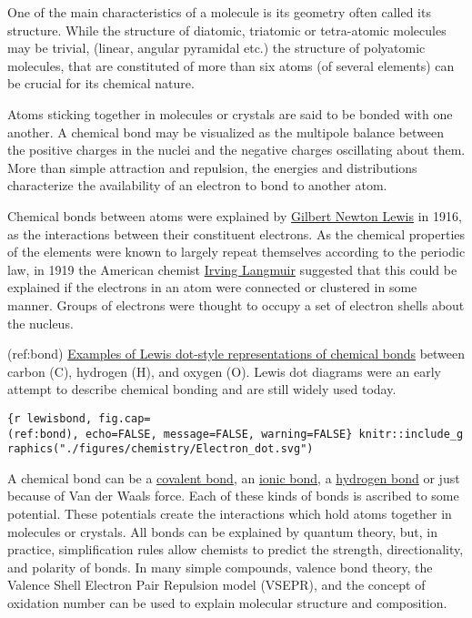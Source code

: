 \documentclass[
]{article}
\begin{document}
One of the main characteristics of a molecule is its geometry often
called its structure. While the structure of diatomic, triatomic or
tetra-atomic molecules may be trivial, (linear, angular pyramidal etc.)
the structure of polyatomic molecules, that are constituted of more than
six atoms (of several elements) can be crucial for its chemical nature.

Atoms sticking together in molecules or crystals are said to be bonded
with one another. A chemical bond may be visualized as the multipole
balance between the positive charges in the nuclei and the negative
charges oscillating about them. More than simple attraction and
repulsion, the energies and distributions characterize the availability
of an electron to bond to another atom.

Chemical bonds between atoms were explained by
\href{https://en.wikipedia.org/wiki/Gilbert_N._Lewis}{Gilbert Newton
Lewis} in 1916, as the interactions between their constituent electrons.
As the chemical properties of the elements were known to largely repeat
themselves according to the periodic law, in 1919 the American chemist
\href{https://en.wikipedia.org/wiki/Irving_Langmuir}{Irving Langmuir}
suggested that this could be explained if the electrons in an atom were
connected or clustered in some manner. Groups of electrons were thought
to occupy a set of electron shells about the nucleus.

(ref:bond)
\href{https://en.wikipedia.org/wiki/Chemical_bond\#/media/File:Electron_dot.svg}{Examples
of Lewis dot-style representations of chemical bonds} between carbon
(C), hydrogen (H), and oxygen (O). Lewis dot diagrams were an early
attempt to describe chemical bonding and are still widely used today.

\texttt{\{r\ lewisbond,\ fig.cap=\textquotesingle{}(ref:bond)\textquotesingle{},\ echo=FALSE,\ message=FALSE,\ warning=FALSE\}\ knitr::include\_graphics("./figures/chemistry/Electron\_dot.svg")}

A chemical bond can be a
\href{https://en.wikipedia.org/wiki/Covalent_bond}{covalent bond}, an
\href{https://en.wikipedia.org/wiki/Ionic_bonding}{ionic bond}, a
\href{https://en.wikipedia.org/wiki/Hydrogen_bond}{hydrogen bond} or
just because of Van der Waals force. Each of these kinds of bonds is
ascribed to some potential. These potentials create the interactions
which hold atoms together in molecules or crystals. All bonds can be
explained by quantum theory, but, in practice, simplification rules
allow chemists to predict the strength, directionality, and polarity of
bonds. In many simple compounds, valence bond theory, the Valence Shell
Electron Pair Repulsion model (VSEPR), and the concept of oxidation
number can be used to explain molecular structure and composition.
\end{document}
